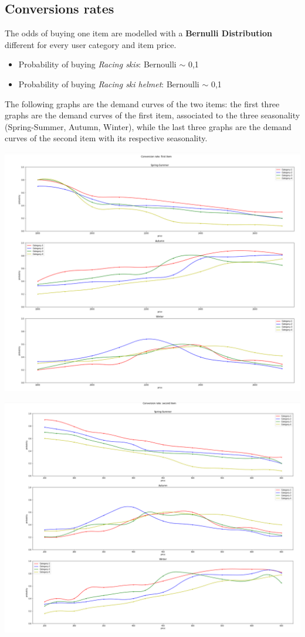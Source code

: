 \subsection*{Conversions rates}
The odds of buying one item are modelled with a \textbf{Bernulli Distribution} different for every user category and item price. 
\begin{itemize}
	\item Probability of buying \textit{Racing skis}: Bernoulli $\sim$ 0,1
	\item Probability of buying \textit{Racing ski helmet}: Bernoulli $\sim$ 0,1
\end{itemize}
The following graphs are the demand curves of the two items: the first three graphs are the demand curves of the first item, associated to the three seasonality (Spring-Summer, Autumn, Winter), while the last three graphs are the demand curves of the second item with its respective seasonality.
\begin{center}
	\includegraphics[scale=0.5]{Images/CR_fstItem}
\end{center}

\begin{center}
	\includegraphics[scale=0.5]{Images/CR_scndItem}
\end{center}

